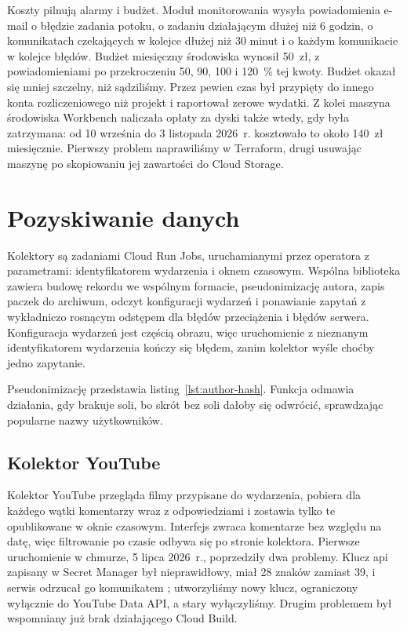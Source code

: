 Koszty pilnują alarmy i budżet.
Moduł monitorowania wysyła powiadomienia e-mail o błędzie zadania potoku, o zadaniu działającym dłużej niż 6 godzin, o komunikatach czekających w kolejce dłużej niż 30 minut i o każdym komunikacie w kolejce błędów.
Budżet miesięczny środowiska wynosił 50~zł, z powiadomieniami po przekroczeniu 50, 90, 100 i \qty{120}{\percent} tej kwoty.
Budżet okazał się mniej szczelny, niż sądziliśmy.
Przez pewien czas był przypięty do innego konta rozliczeniowego niż projekt i raportował zerowe wydatki.
Z kolei maszyna środowiska Workbench naliczała opłaty za dyski także wtedy, gdy była zatrzymana: od 10 września do 3 listopada 2026~r. kosztowało to około 140~zł miesięcznie.
Pierwszy problem naprawiliśmy w Terraform, drugi usuwając maszynę po skopiowaniu jej zawartości do Cloud Storage.

\section{Pozyskiwanie danych}
\label{sec:impl-collection}

Kolektory są zadaniami Cloud Run Jobs, uruchamianymi przez operatora z parametrami: identyfikatorem wydarzenia i oknem czasowym.
Wspólna biblioteka  zawiera budowę rekordu we wspólnym formacie, pseudonimizację autora, zapis paczek do archiwum, odczyt konfiguracji wydarzeń i ponawianie zapytań z wykładniczo rosnącym odstępem dla błędów przeciążenia i błędów serwera.
Konfiguracja wydarzeń jest częścią obrazu, więc uruchomienie z nieznanym identyfikatorem wydarzenia kończy się błędem, zanim kolektor wyśle choćby jedno zapytanie.

Pseudonimizację przedstawia listing~\ref{lst:author-hash}.
Funkcja odmawia działania, gdy brakuje soli, bo skrót bez soli dałoby się odwrócić, sprawdzając popularne nazwy użytkowników.



\subsection{Kolektor YouTube}
\label{sec:impl-youtube}

Kolektor YouTube przegląda filmy przypisane do wydarzenia, pobiera dla każdego wątki komentarzy wraz z odpowiedziami i zostawia tylko te opublikowane w oknie czasowym.
Interfejs zwraca komentarze bez względu na datę, więc filtrowanie po czasie odbywa się po stronie kolektora.
Pierwsze uruchomienie w chmurze, 5 lipca 2026~r., poprzedziły dwa problemy.
Klucz \ac{api} zapisany w Secret Manager był nieprawidłowy, miał 28 znaków zamiast 39, i serwis odrzucał go komunikatem ; utworzyliśmy nowy klucz, ograniczony wyłącznie do YouTube Data API, a stary wyłączyliśmy.
Drugim problemem był wspomniany już brak działającego Cloud Build.

